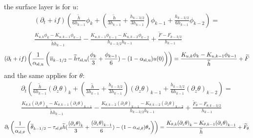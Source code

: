 the surface layer is for $u$:
\begin{equation}
\label{eq:ND_Ocean_prognosticu_FVfree}
    \begin{aligned}
(\partial_t + if)
	    \left(\frac{\widetilde{h}}{6h_{k-1}} 
    \phi_k
    +
    \left(
	    \frac{\widetilde{h}}{3h_{k-1}} 
	    + \frac{h_{k-3/2}}{3h_{k-1}}
    \right)
	    \phi_{k-1}
	    + \frac{h_{k-3/2}}{6h_{k-1}} \phi_{k-2}\right)
    = \\
	     \frac{K_{u, k} \phi_{k} -
	    K_{u,k-1} \phi_{k-1} }{\widetilde{h}h_{k-1}} -
\frac{K_{u, k-1} \phi_{k-1} - K_{u, k-2} \phi_{k-2}}
	    {h_{k-3/2}h_{k-1}} + \frac{\widetilde{F} - F_{k-3/2}}
	    {h_{k-1}}
    \end{aligned}
\end{equation}
\begin{equation}
	\label{eq:ND_Ocean_semiDiscreteEkmanEqFVfree}
	(\partial_t+if) \left(\frac{1}{\alpha_{\rm sl, u}}
	\left(\overline{u}_{k-1/2} - \widetilde{h}\tau_{\rm sl, u}
	(\frac{\phi_k}{3} + \frac{\phi_{k-1}}{6}) - 
	(1-\alpha_{\rm sl, u})u(0)\right)\right)
	= \frac{K_{u, k}\phi_{k} - K_{u,k-1} \phi_{k-1}}{\widetilde{h}}
	+ \widetilde{F}
\end{equation}
and the same applies for $\theta$:
\begin{equation}
\label{eq:ND_Ocean_prognosticPT_FVfree}
    \begin{aligned}
\partial_t \left(\frac{\widetilde{h}}{6h_{k-1}} 
	    {(\partial_z \theta)}_k
    +
    \left(
	    \frac{\widetilde{h}}{3h_{k-1}} 
	    + \frac{h_{k-3/2}}{3h_{k-1}}
    \right)
	    {(\partial_z \theta)}_{k-1}
	    + \frac{h_{k-3/2}}{6h_{k-1}} {(\partial_z \theta)}_{k-2}\right)
    = \\
	    \frac{K_{\theta, k} {(\partial_z \theta)}_{k} -
	    K_{\theta, k-1} {(\partial_z \theta)}_{k-1} }{\widetilde{h}h_{k-1}}
	    -\frac{K_{\theta, k-2} {(\partial_z \theta)}_{k-1} -
	    K_{\theta, k-2} {(\partial_z \theta)}_{k-2}}
	    {h_{k-3/2}h_{k-1}} + \frac{\widetilde{F}_\theta -
	    F_{\theta, k-3/2}}{h_{k-1}}
    \end{aligned}
\end{equation}
\begin{equation}
	\label{eq:ND_Ocean_semiDiscreteEkmanEqPTFVfree}
	\partial_t \left(\frac{1}{\alpha_{\rm sl, \theta}}
	\left(
	\overline{\theta}_{k-1/2} - \tau_{sl, \theta}
	\widetilde{h}(\frac{{(\partial_z \theta)}_k}{3} +
	\frac{{(\partial_z \theta)}_{k-1}}{6})
	 - (1 - \alpha_{sl, \theta})\theta_s
	\right) \right)
	= \frac{K_{\theta, k}{(\partial_z \theta)}_{k} -
	K_{\theta,k-1} {(\partial_z \theta)}_{k-1}}{\widetilde{h}}
	+ \widetilde{F}_\theta 
\end{equation}

